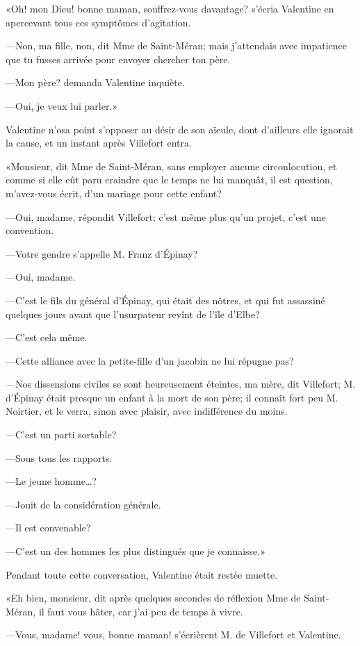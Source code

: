 «Oh! mon Dieu! bonne maman, souffrez-vous davantage? s'écria Valentine en apercevant tous ces symptômes d'agitation. 

—Non, ma fille, non, dit Mme de Saint-Méran; mais j'attendais avec impatience que tu fusses arrivée pour envoyer chercher ton père. 

—Mon père? demanda Valentine inquiète. 

—Oui, je veux lui parler.» 

Valentine n'osa point s'opposer au désir de son aïeule, dont d'ailleurs elle ignorait la cause, et un instant après Villefort entra.  

«Monsieur, dit Mme de Saint-Méran, sans employer aucune circonlocution, et comme si elle eût paru craindre que le temps ne lui manquât, il est question, m'avez-vous écrit, d'un mariage pour cette enfant? 

—Oui, madame, répondit Villefort; c'est même plus qu'un projet, c'est une convention. 

—Votre gendre s'appelle M. Franz d'Épinay? 

—Oui, madame. 

—C'est le fils du général d'Épinay, qui était des nôtres, et qui fut assassiné quelques jours avant que l'usurpateur revînt de l'île d'Elbe? 

—C'est cela même. 

—Cette alliance avec la petite-fille d'un jacobin ne lui répugne pas? 

—Nos dissensions civiles se sont heureusement éteintes, ma mère, dit Villefort; M. d'Épinay était presque un enfant à la mort de son père; il connaît fort peu M. Noirtier, et le verra, sinon avec plaisir, avec indifférence du moins. 

—C'est un parti sortable? 

—Sous tous les rapports. 

—Le jeune homme\dots?  

—Jouit de la considération générale. 

—Il est convenable? 

—C'est un des hommes les plus distingués que je connaisse.» 

Pendant toute cette conversation, Valentine était restée muette. 

«Eh bien, monsieur, dit après quelques secondes de réflexion Mme de Saint-Méran, il faut vous hâter, car j'ai peu de temps à vivre. 

—Vous, madame! vous, bonne maman! s'écrièrent M. de Villefort et Valentine. 

